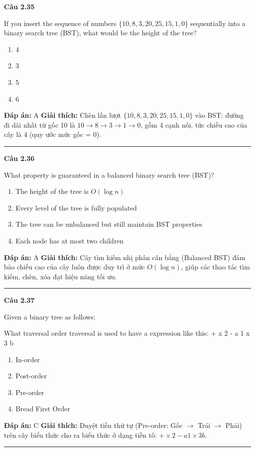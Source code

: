 \documentclass[11pt,a4paper]{article}
\newenvironment{question}[1]{%
  \par\vspace{1em}\noindent\textbf{\large Câu #1}\par\vspace{0.4em}
}{%
  \par\vspace{1em}\hrule\vspace{0.6em}
}
\newenvironment{choices}{%
  \begin{enumerate}[label=\textbf{\Alph*.},leftmargin=2.2em,itemsep=2pt,topsep=3pt]
}{%
  \end{enumerate}
}
\newcommand{\choice}{\item}
\begin{document}
\begin{question}{2.35}
If you insert the sequence of numbers $\{10, 8, 3, 20, 25, 15, 1, 0\}$ sequentially into a binary search tree (BST), what would be the height of the tree?
\begin{choices}
\choice 4
\choice 3
\choice 5
\choice 6
\end{choices}
\textbf{Đáp án:} A
\textbf{Giải thích:} Chèn lần lượt $\{10, 8, 3, 20, 25, 15, 1, 0\}$ vào BST: đường đi dài nhất từ gốc 10 là $10 \to 8 \to 3 \to 1 \to 0$, gồm 4 cạnh nối, tức chiều cao của cây là 4 (quy ước mức gốc = 0).
\end{question}

\begin{question}{2.36}
What property is guaranteed in a balanced binary search tree (BST)?
\begin{choices}
\choice The height of the tree is $O(\log n)$
\choice Every level of the tree is fully populated
\choice The tree can be unbalanced but still maintain BST properties
\choice Each node has at most two children
\end{choices}
\textbf{Đáp án:} A
\textbf{Giải thích:} Cây tìm kiếm nhị phân cân bằng (Balanced BST) đảm bảo chiều cao của cây luôn được duy trì ở mức $O(\log n)$, giúp các thao tác tìm kiếm, chèn, xóa đạt hiệu năng tối ưu.
\end{question}

\begin{question}{2.37}
Given a binary tree as follows:
\begin{center}
\end{center}
What traversal order traversal is used to have a expression like this:
+ x 2 - a 1 x 3 b
\begin{choices}
\choice In-order
\choice Post-order
\choice Pre-order
\choice Bread First Order
\end{choices}
\textbf{Đáp án:} C
\textbf{Giải thích:} Duyệt tiền thứ tự (Pre-order: Gốc $\to$ Trái $\to$ Phải) trên cây biểu thức cho ra biểu thức ở dạng tiền tố: $+ \times 2 - a 1 \times 3 b$.
\end{question}
\end{document}
